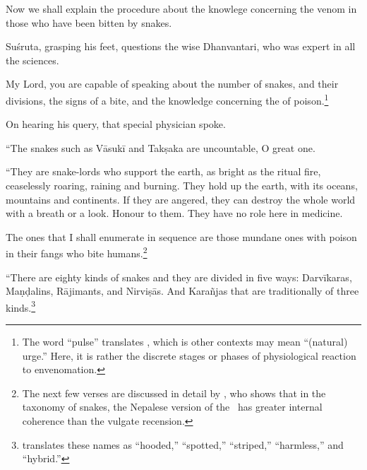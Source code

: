 \begin{translation}
    \item[1] Now we shall explain the procedure about the knowlege 
    concerning the venom in those who have been bitten by snakes. 
    
    \item[3] Suśruta, grasping his feet, questions the wise Dhanvantari, who was 
    expert in all the sciences.
    
    \item[4]
    
    My Lord, you are capable of speaking about the number of snakes, and their 
    divisions, the signs of a bite, and the knowledge concerning the 
     of poison.\footnote{The word “pulse” translates , 
    which is other contexts may mean “(natural) urge.”  Here, it is rather the 
    discrete stages or phases of physiological reaction to envenomation.}
        
    \item[5]
    
    On hearing his query, that special physician spoke.
    
    “The snakes such as Vāsukī and Takṣaka are uncountable, O great 
    one.
    
\item[6--9ab]

“They are snake-lords who support the earth, as bright as the ritual fire,
ceaselessly roaring, raining and burning. They hold up the earth, with its
oceans, mountains and continents. If they are angered, they can destroy the whole 
world with a breath or a look.  Honour to them. They have no role here in medicine. 

The ones that I shall enumerate in sequence are those mundane ones with
poison in their fangs who bite humans.\footnote{The next few verses are
    discussed in detail by \citet[101--104]{hari-2011}, who shows that in the
    taxonomy of snakes, the Nepalese version of the \SS\ has greater internal
    coherence than the vulgate recension.}

\item[9cd--10]    

“There are eighty kinds of snakes and they are divided in five ways:
Darvīkaras, Maṇḍalins, Rājimants, and Nirviṣās.  And Karañjas that are
traditionally of three kinds.\footnote{\citet{hari-2011} translates these
    names as “hooded,” “spotted,” “striped,” “harmless,” and “hybrid.”}
\end{translation}
